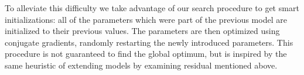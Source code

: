\documentclass[twoside]{article}
\begin{document}
To alleviate this difficulty we take advantage of our search procedure to get smart initializations: all of the parameters which were part of the previous model are initialized to their previous values.
The parameters are then optimized using conjugate gradients, randomly restarting the newly introduced parameters.
This procedure is not guaranteed to find the global optimum, but is inspired by the same heuristic of extending models by examining residual mentioned above.




\end{document}
